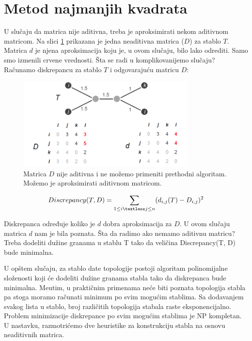 \section{Metod najmanjih kvadrata}
\label{sec:metodnajmanjihkvadrata}

U slu\v{c}aju da matrica nije aditivna, treba je aproksimirati nekom aditivnom matricom. Na slici \ref{fig:lsq} prikazana je jedna neaditivna matrica ($D$) za stablo $T$. Matrica $d$ je njena aproksimacija koju je, u ovom slučaju, bilo lako odrediti. Samo smo izmenili crvene vrednosti. Šta se radi u komplikovanijemo slučaju? Računamo diskrepancu za stablo $T$ i odgovarajuću matricu $D$:

\begin{figure}[h!]
	\centering
	\includegraphics[width=0.8\textwidth]{poglavlja/7/slike/metodNajmanjihKvadrata.png}
	\caption{Matrica $D$ nije aditivna i ne možemo primeniti prethodni algoritam. Možemo je aproksimirati aditivnom matricom.}
	\label{fig:lsq}
\end{figure}

$$Discrepancy(T, D) = \sum_{1 \leq i \textless j \leq n} (d_{i, j}(T) - D_{i, j})^{2}$$

Diskrepanca određuje koliko je $d$ dobra aproksimacija za $D$. U ovom slučaju matrica $d$ nam je bila poznata. Šta da radimo ako nemamo aditivnu matricu? Treba dodeliti du\v{z}ine granama u stablu T tako da veli\v{c}ina Discrepancy(T, D) bude minimalna.

U op\v{s}tem slu\v{c}aju, za stablo date topologije postoji algoritam polinomijalne slo\v{z}enosti koji \'ce dodeliti du\v{z}ine granama stabla tako da diskrepanca bude minimalna. Me\dj utim, u prakti\v{c}nim primenama ne\'ce biti poznata topologija stabla pa stoga moramo ra\v{c}unati minimum po svim mogu\'cim stablima. Sa dodavanjem svakog lista u stablo, broj razli\v{c}itih topologija stabala raste eksponencijalno. Problem minimizacije diskrepance po svim mogu\'cim stablima je NP kompletan. U nastavku, razmotri\'cemo dve heuristike za konstrukciju stabla na osnovu neaditivnih matrica.

